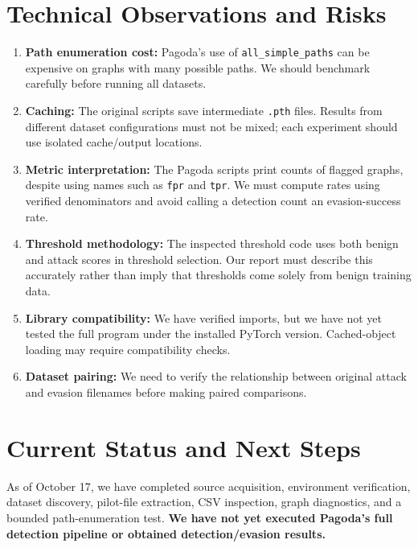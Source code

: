 \documentclass[11pt,letterpaper]{article}
\begin{document}
\section{Technical Observations and Risks}
\begin{enumerate}[leftmargin=*]
\item \textbf{Path enumeration cost:} Pagoda's use of \texttt{all\_simple\_paths} can be expensive on graphs with many possible paths. We should benchmark carefully before running all datasets.
\item \textbf{Caching:} The original scripts save intermediate \texttt{.pth} files. Results from different dataset configurations must not be mixed; each experiment should use isolated cache/output locations.
\item \textbf{Metric interpretation:} The Pagoda scripts print counts of flagged graphs, despite using names such as \texttt{fpr} and \texttt{tpr}. We must compute rates using verified denominators and avoid calling a detection count an evasion-success rate.
\item \textbf{Threshold methodology:} The inspected threshold code uses both benign and attack scores in threshold selection. Our report must describe this accurately rather than imply that thresholds come solely from benign training data.
\item \textbf{Library compatibility:} We have verified imports, but we have not yet tested the full program under the installed PyTorch version. Cached-object loading may require compatibility checks.
\item \textbf{Dataset pairing:} We need to verify the relationship between original attack and evasion filenames before making paired comparisons.
\end{enumerate}

\section{Current Status and Next Steps}
As of October 17, we have completed source acquisition, environment verification, dataset discovery, pilot-file extraction, CSV inspection, graph diagnostics, and a bounded path-enumeration test. \textbf{We have not yet executed Pagoda's full detection pipeline or obtained detection/evasion results.}
\end{document}
